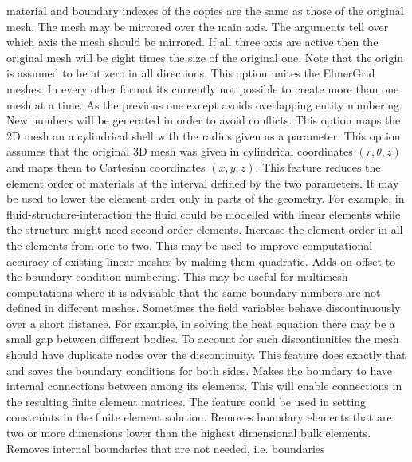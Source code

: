 material and boundary indexes of the copies are the same as those of
the original mesh.
%
The mesh may be mirrored over the main axis. The arguments 
tell over which axis the mesh should be mirrored. If all three axis
are active then the original mesh will be eight times the size of the original one.
Note that the origin is assumed to be at zero in all directions.
%
This option unites the ElmerGrid meshes. In every other format its currently
not possible to create more than one mesh at a time.
As the previous one except avoids overlapping entity numbering.
New numbers will be generated in order to avoid conflicts.
%
This option maps the 2D mesh an a cylindrical shell with the radius
given as a parameter.
%
This option assumes that the original 3D mesh was given in 
cylindrical coordinates $(r,\theta,z)$ and maps them to Cartesian 
coordinates $(x,y,z)$.
%
This feature reduces the element order of materials at the interval
defined by the two parameters. It may be used to lower the element order 
only in parts of the geometry. For example, in fluid-structure-interaction the 
fluid could be modelled with linear elements while the 
structure might need second order elements.
%
Increase the element order in all the elements from one to two.
This may be used to improve computational accuracy of existing 
linear meshes by making them quadratic.
%
Adds on offset to the boundary condition numbering. This may be useful for multimesh
computations where it is advisable that the same boundary numbers are not defined in 
different meshes. 
%
Sometimes the field variables behave discontinuously over a short distance.
For example, in solving the heat equation there may be a small gap between
different bodies. To account for such discontinuities the mesh should
have duplicate nodes over the discontinuity. This feature does exactly that
and saves the boundary conditions for both sides.
%
Makes the boundary to have internal connections between among its elements. This
will enable connections in the resulting finite element matrices. The feature could 
be used in setting constraints in the finite element solution. 
%
Removes boundary elements that are two or more dimensions lower than the 
highest dimensional bulk elements. 
%
Removes internal boundaries that are not needed, i.e. boundaries
